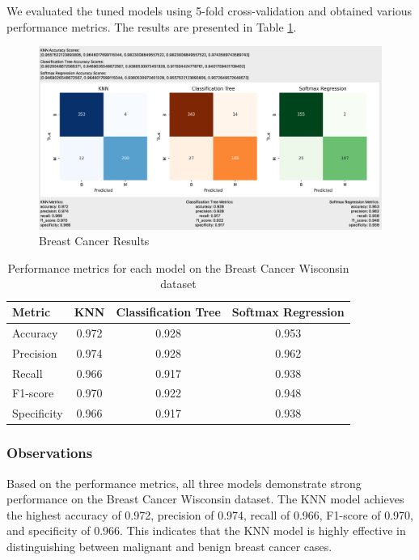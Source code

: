 \documentclass[letterpaper,10pt]{article}
\begin{document}
We evaluated the tuned models using 5-fold cross-validation and obtained various performance metrics. The results are presented in Table \ref{tab:breast_cancer_metrics}.

\begin{figure}[ht]
    \centering
    \includegraphics[width=1.0\textwidth]{bcancer_results.png}
    \caption{Breast Cancer Results}
    \label{bcancer_results}
\end{figure}
\begin{table}[h]
\centering
\caption{Performance metrics for each model on the Breast Cancer Wisconsin dataset}
\label{tab:breast_cancer_metrics}
\begin{tabular}{|l|c|c|c|}
\hline
\textbf{Metric} & \textbf{KNN} & \textbf{Classification Tree} & \textbf{Softmax Regression} \\
\hline
Accuracy & 0.972 & 0.928 & 0.953 \\
\hline
Precision & 0.974 & 0.928 & 0.962 \\
\hline
Recall & 0.966 & 0.917 & 0.938 \\
\hline
F1-score & 0.970 & 0.922 & 0.948 \\
\hline
Specificity & 0.966 & 0.917 & 0.938 \\
\hline
\end{tabular}
\end{table}


\subsubsection{Observations}

Based on the performance metrics, all three models demonstrate strong performance on the Breast Cancer Wisconsin dataset. The KNN model achieves the highest accuracy of 0.972, precision of 0.974, recall of 0.966, F1-score of 0.970, and specificity of 0.966. This indicates that the KNN model is highly effective in distinguishing between malignant and benign breast cancer cases.
\end{document}
